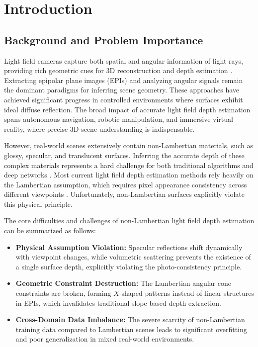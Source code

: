 \section{Introduction}
\subsection{Background and Problem Importance}

Light field cameras capture both spatial and angular information of light rays, providing rich geometric cues for 3D reconstruction and depth estimation \cite{light_field_imaging, depth_estimation}. Extracting epipolar plane images (EPIs) and analyzing angular signals remain the dominant paradigms for inferring scene geometry. These approaches have achieved significant progress in controlled environments where surfaces exhibit ideal diffuse reflection. The broad impact of accurate light field depth estimation spans autonomous navigation, robotic manipulation, and immersive virtual reality, where precise 3D scene understanding is indispensable.

However, real-world scenes extensively contain non-Lambertian materials, such as glossy, specular, and translucent surfaces. Inferring the accurate depth of these complex materials represents a hard challenge for both traditional algorithms and deep networks \cite{non_lambertian_surfaces, specular_reflection}. Most current light field depth estimation methods rely heavily on the Lambertian assumption, which requires pixel appearance consistency across different viewpoints \cite{photo_consistency, lambertian_assumption}. Unfortunately, non-Lambertian surfaces explicitly violate this physical principle. 

The core difficulties and challenges of non-Lambertian light field depth estimation can be summarized as follows:
\begin{itemize}
\item \textbf{Physical Assumption Violation:} Specular reflections shift dynamically with viewpoint changes, while volumetric scattering prevents the existence of a single surface depth, explicitly violating the photo-consistency principle.
\item \textbf{Geometric Constraint Destruction:} The Lambertian angular cone constraints are broken, forming $X$-shaped patterns instead of linear structures in EPIs, which invalidates traditional slope-based depth extraction.
\item \textbf{Cross-Domain Data Imbalance:} The severe scarcity of non-Lambertian training data compared to Lambertian scenes leads to significant overfitting and poor generalization in mixed real-world environments.
\end{itemize}

